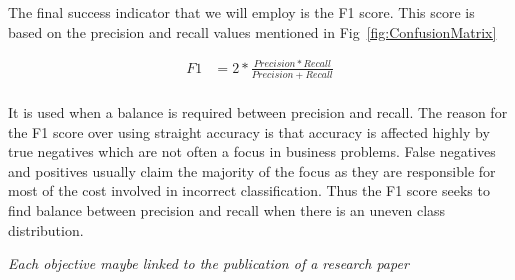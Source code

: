 

The final success indicator that we will employ is the F1 score. This score is based on the precision and recall values mentioned in Fig~\ref{fig:ConfusionMatrix}

\begin{align*}
  F1 & = 2 * \frac{Precision*Recall}{Precision+Recall} \\
\end{align*}

It is used when a balance is required between precision and recall. The reason for the F1 score over using straight accuracy is that accuracy is affected highly by true negatives which are not often a focus in business problems. False negatives and positives usually claim the majority of the focus as they are responsible for most of the cost involved in incorrect classification. Thus the F1 score seeks to find balance between precision and recall when there is an uneven class distribution.












\textit{Each objective maybe linked to the publication of a research paper}